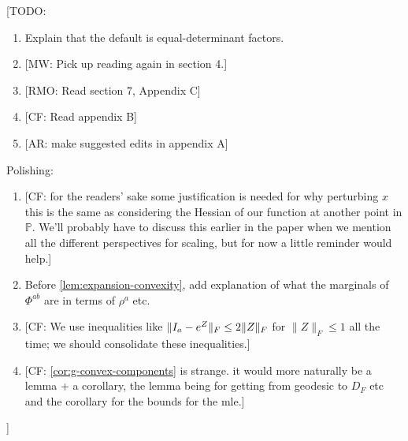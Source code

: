 \documentclass[aos]{imsart}
\theoremstyle{definition}
\numberwithin{equation}{section}
\DeclarePairedDelimiter{\norm}{\lVert}{\rVert}
\newcommand{\eps}{\varepsilon}
\newcommand{\SPD}{\mathbb{P}}
\newcommand{\samp}{x}
\newcommand{\CF}[1]{{\color{purple}[CF: #1]}}
\newcommand{\AR}[1]{{\color{orange}[AR: #1]}}
\newcommand{\RMO}[1]{{\color{olive}[RMO: #1]}}
\newcommand{\MW}[1]{{\color{red}[MW: #1]}}
\newcommand{\TODO}[1]{{\color{blue}[TODO: #1]}}
\begin{document}
\TODO{
\begin{enumerate}
\item Explain that the default is equal-determinant factors.
\item \MW{Pick up reading again in section 4.}
\item \RMO{Read section 7, Appendix C}
\item \CF{Read appendix B}
\item \AR{make suggested edits in appendix A}
\end{enumerate}
Polishing:
\begin{enumerate}
\item \CF{for the readers' sake some justification is needed for why perturbing $\samp$ this is the same as considering the Hessian of our function at another point in $\SPD$. We'll probably have to discuss this earlier in the paper when we mention all the different perspectives for scaling, but for now a little reminder would help.}
\item Before \cref{lem:expansion-convexity}, add explanation of what the marginals of $\Phi^{ab}$ are in terms of $\rho^{a}$ etc.
\item \CF{We use inequalities like $\norm{I_a - e^{Z}}_F
\leq 2 \norm{Z}_F$ for $\|Z\|_F \leq 1$ all the time; we should consolidate these inequalities.}
\item \CF{\cref{cor:g-convex-components} is strange. it would more naturally be a lemma + a corollary, the lemma being for getting from geodesic to $D_F$ etc and the corollary for the bounds for the mle.}
\end{enumerate}
}
\end{document}
